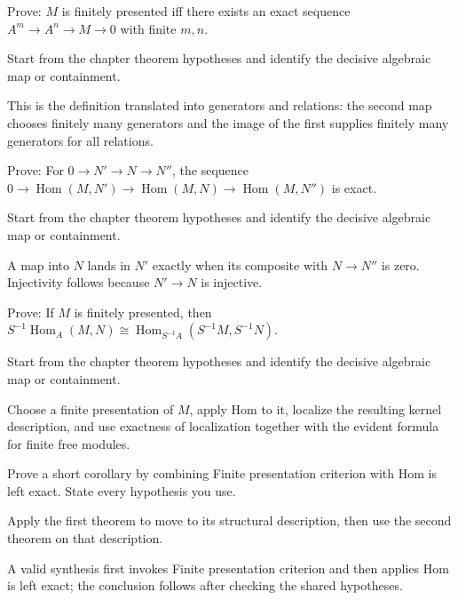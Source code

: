 \begin{exercise}\label{exr:v12-expand-06}
Prove: $M$ is finitely presented iff there exists an exact sequence $A^m\to A^n\to M\to0$ with finite $m,n$.
\end{exercise}
\begin{hint}
Start from the chapter theorem hypotheses and identify the decisive algebraic map or containment.
\end{hint}
\begin{solution}
This is the definition translated into generators and relations: the second map chooses finitely many generators and the image of the first supplies finitely many generators for all relations.
\end{solution}

\begin{exercise}\label{exr:v12-expand-07}
Prove: For $0\to N'\to N\to N''$, the sequence $0\to\operatorname{Hom}(M,N')\to\operatorname{Hom}(M,N)\to\operatorname{Hom}(M,N'')$ is exact.
\end{exercise}
\begin{hint}
Start from the chapter theorem hypotheses and identify the decisive algebraic map or containment.
\end{hint}
\begin{solution}
A map into $N$ lands in $N'$ exactly when its composite with $N\to N''$ is zero. Injectivity follows because $N'\to N$ is injective.
\end{solution}

\begin{exercise}\label{exr:v12-expand-08}
Prove: If $M$ is finitely presented, then $S^{-1}\operatorname{Hom}_A(M,N)\cong\operatorname{Hom}_{S^{-1}A}(S^{-1}M,S^{-1}N)$.
\end{exercise}
\begin{hint}
Start from the chapter theorem hypotheses and identify the decisive algebraic map or containment.
\end{hint}
\begin{solution}
Choose a finite presentation of $M$, apply Hom to it, localize the resulting kernel description, and use exactness of localization together with the evident formula for finite free modules.
\end{solution}

\begin{exercise}\label{exr:v12-expand-09}
Prove a short corollary by combining Finite presentation criterion with Hom is left exact. State every hypothesis you use.
\end{exercise}
\begin{hint}
Apply the first theorem to move to its structural description, then use the second theorem on that description.
\end{hint}
\begin{solution}
A valid synthesis first invokes Finite presentation criterion and then applies Hom is left exact; the conclusion follows after checking the shared hypotheses.
\end{solution}

